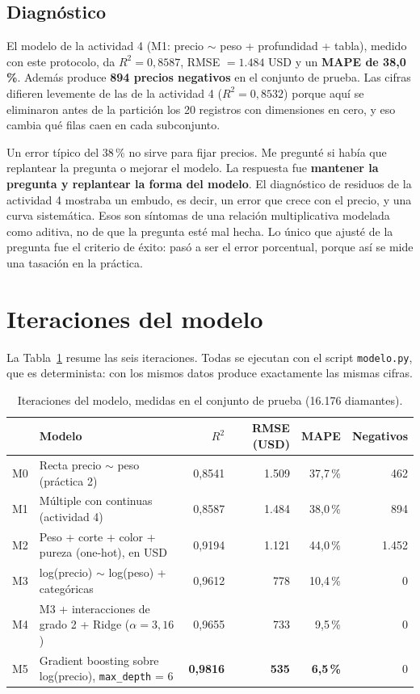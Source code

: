 \documentclass[12pt,letterpaper]{article}
\begin{document}
\subsection{Diagnóstico}

El modelo de la actividad 4 (M1: precio $\sim$ peso + profundidad + tabla),
medido con este protocolo, da $R^2 = 0{,}8587$, RMSE $= 1.484$ USD y un
\textbf{MAPE de 38,0\,\%}. Además produce \textbf{894 precios negativos} en
el conjunto de prueba. Las cifras difieren levemente de las de la actividad 4
($R^2 = 0{,}8532$) porque aquí se eliminaron antes de la partición los 20
registros con dimensiones en cero, y eso cambia qué filas caen en cada
subconjunto.

Un error típico del 38\,\% no sirve para fijar precios. Me pregunté si había que
replantear la pregunta o mejorar el modelo. La respuesta fue \textbf{mantener la
pregunta y replantear la forma del modelo}. El diagnóstico de residuos de la
actividad 4 mostraba un embudo, es decir, un error que crece con el precio, y una
curva sistemática. Esos son síntomas de una relación multiplicativa modelada como
aditiva, no de que la pregunta esté mal hecha. Lo único que ajusté de la pregunta
fue el criterio de éxito: pasó a ser el error porcentual, porque así se mide una
tasación en la práctica.

\section{Iteraciones del modelo}

La Tabla~\ref{tab:iter} resume las seis iteraciones. Todas se ejecutan con el
script \texttt{modelo.py}, que es determinista: con los mismos datos produce
exactamente las mismas cifras.

\begin{table}[H]
\centering
\small
\caption{Iteraciones del modelo, medidas en el conjunto de prueba (16.176 diamantes).}
\label{tab:iter}
\begin{tabularx}{\textwidth}{@{}lXrrrr@{}}
\toprule
 & Modelo & $R^2$ & RMSE (USD) & MAPE & Negativos \\
\midrule
M0 & Recta precio $\sim$ peso (práctica 2) & 0,8541 & 1.509 & 37,7\,\% & 462 \\
M1 & Múltiple con continuas (actividad 4) & 0,8587 & 1.484 & 38,0\,\% & 894 \\
M2 & Peso + corte + color + pureza (one-hot), en USD & 0,9194 & 1.121 & 44,0\,\% & 1.452 \\
M3 & log(precio) $\sim$ log(peso) + categóricas & 0,9612 & 778 & 10,4\,\% & 0 \\
M4 & M3 + interacciones de grado 2 + Ridge ($\alpha = 3{,}16$) & 0,9655 & 733 & 9,5\,\% & 0 \\
M5 & Gradient boosting sobre log(precio), \texttt{max\_depth} = 6 & \textbf{0,9816} & \textbf{535} & \textbf{6,5\,\%} & 0 \\
\bottomrule
\end{tabularx}
\end{table}
\end{document}

